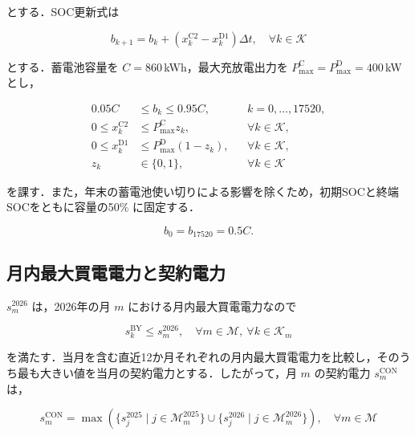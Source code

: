 \documentclass[a4paper,11pt,dvipdfmx]{jsarticle}
\begin{document}
とする．SOC更新式は

\begin{equation}
    b_{k+1}
    =b_k+
    \left(x_k^{\mathrm{C2}}-x_k^{\mathrm{D1}}\right)\Delta t,
    \quad \forall k\in\mathcal{K}
\end{equation}

とする．蓄電池容量を $C=860$\,kWh，最大充放電出力を $P_{\max}^{\mathrm{C}}=P_{\max}^{\mathrm{D}}=400$\,kW とし，

\begin{align}
    0.05C
        & \leq b_k\leq0.95C,
        &                                    & k=0,\ldots,17520,        \\
    0\leq x_k^{\mathrm{C2}}
        & \leq P_{\max}^{\mathrm{C}}z_k,
        &                                    & \forall k\in\mathcal{K}, \\
    0\leq x_k^{\mathrm{D1}}
        & \leq P_{\max}^{\mathrm{D}}(1-z_k),
        &                                    & \forall k\in\mathcal{K}, \\
    z_k & \in\{0,1\},
        &                                    & \forall k\in\mathcal{K}
\end{align}

を課す．また，年末の蓄電池使い切りによる影響を除くため，初期SOCと終端SOCをともに容量の50\% に固定する．

\begin{equation}
    b_0=b_{17520}=0.5C.
\end{equation}

\subsection{月内最大買電電力と契約電力}

$s_m^{2026}$ は，2026年の月 $m$ における月内最大買電電力なので

\begin{equation}
    s_k^{\mathrm{BY}}\leq s_m^{2026},
    \quad \forall m\in\mathcal{M},\ \forall k\in\mathcal{K}_m
\end{equation}

を満たす．当月を含む直近12か月それぞれの月内最大買電電力を比較し，そのうち最も大きい値を当月の契約電力とする．したがって，月 $m$ の契約電力 $s_m^{\mathrm{CON}}$ は，

\begin{equation}
    \label{eq:contract_rule}
    s_m^{\mathrm{CON}}
    =\max\left(
    \{s_j^{2025}\mid j\in\mathcal{M}_m^{2025}\}
    \cup
    \{s_j^{2026}\mid j\in\mathcal{M}_m^{2026}\}
    \right),
    \quad \forall m\in\mathcal{M}
\end{equation}
\end{document}
